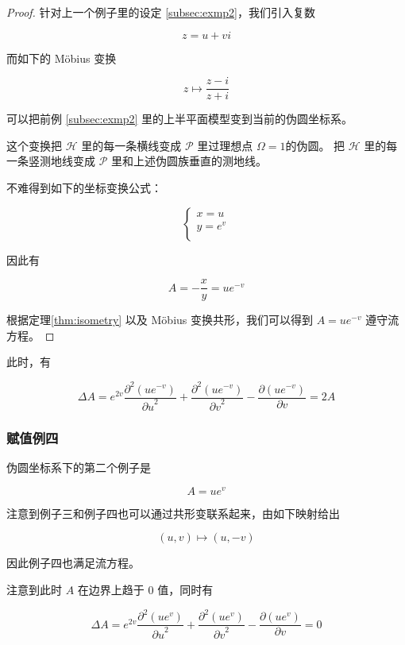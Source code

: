 \documentclass[a4paper,12pt]{article}
\numberwithin{definition}{section}
\numberwithin{lemma}{section}
\numberwithin{proposition}{section}
\numberwithin{theorem}{section}
\numberwithin{grammar}{section}
\numberwithin{program}{section}
\numberwithin{convention}{section}
\numberwithin{corollary}{section}
\begin{document}
\begin{proof}

针对上一个例子里的设定 \ref{subsec:exmp2}，我们引入复数

$$
z = u + v i
$$

而如下的 Möbius 变换

$$
z \mapsto \frac{z-i}{z+i}
$$

可以把前例 \ref{subsec:exmp2} 里的上半平面模型变到当前的伪圆坐标系。

这个变换把 $\mathcal{H}$ 里的每一条横线变成 $\mathcal{P}$ 里过理想点 $\Omega = 1$的伪圆。
把 $\mathcal{H}$ 里的每一条竖测地线变成 $\mathcal{P}$ 里和上述伪圆族垂直的测地线。

不难得到如下的坐标变换公式：

$$
\begin{cases}
x = u\\
y = e^v \\
\end{cases}
$$

因此有

$$
A = -\frac{x}{y} = u e^{-v}
$$

根据定理\ref{thm:isometry} 以及 Möbius 变换共形，我们可以得到 $A = u e^{-v}$ 遵守流方程。

\end{proof}

此时，有

$$
\Delta A = e^{2v} \frac{\partial^2(u e^{-v})}{{\partial u}^2} + \frac{\partial^2(u e^{-v})}{{\partial v}^2} - \frac{\partial(u e^{-v})}{\partial v} = 2A
$$

\subsubsection{赋值例四}\label{subsec:exmp4}

伪圆坐标系下的第二个例子是

\begin{equation}
A = u e^v
\end{equation}

注意到例子三和例子四也可以通过共形变联系起来，由如下映射给出

$$
(u, v) \mapsto (u, -v)
$$

因此例子四也满足流方程。

注意到此时 $A$ 在边界上趋于 $0$ 值，同时有

$$
\Delta A = e^{2v} \frac{\partial^2(u e^v)}{{\partial u}^2} + \frac{\partial^2(u e^v)}{{\partial v}^2} - \frac{\partial(u e^v)}{\partial v} = 0
$$
\end{document}
